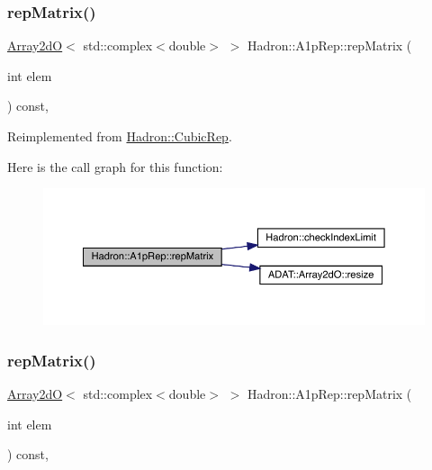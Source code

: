 \subsubsection{\texorpdfstring{repMatrix()}{repMatrix()}\hspace{0.1cm}{\footnotesize\ttfamily [1/3]}}
{\footnotesize\ttfamily \mbox{\hyperlink{classADAT_1_1Array2dO}{Array2dO}}$<$ std\+::complex$<$double$>$ $>$ Hadron\+::\+A1p\+Rep\+::rep\+Matrix (\begin{DoxyParamCaption}\item[{int}]{elem }\end{DoxyParamCaption}) const\hspace{0.3cm}{\ttfamily [inline]}, {\ttfamily [virtual]}}



Reimplemented from \mbox{\hyperlink{structHadron_1_1CubicRep_ac5d7e9e6f4ab1158b5fce3e4ad9e8005}{Hadron\+::\+Cubic\+Rep}}.

Here is the call graph for this function\+:
\nopagebreak
\begin{figure}[H]
\begin{center}
\leavevmode
\includegraphics[width=350pt]{da/dc7/structHadron_1_1A1pRep_a23b801cc71ff71d666e68a3c065d3fae_cgraph}
\end{center}
\end{figure}
\mbox{\label{structHadron_1_1A1pRep_a23b801cc71ff71d666e68a3c065d3fae}} 
\subsubsection{\texorpdfstring{repMatrix()}{repMatrix()}\hspace{0.1cm}{\footnotesize\ttfamily [2/3]}}
{\footnotesize\ttfamily \mbox{\hyperlink{classADAT_1_1Array2dO}{Array2dO}}$<$ std\+::complex$<$double$>$ $>$ Hadron\+::\+A1p\+Rep\+::rep\+Matrix (\begin{DoxyParamCaption}\item[{int}]{elem }\end{DoxyParamCaption}) const\hspace{0.3cm}{\ttfamily [inline]}, {\ttfamily [virtual]}}



